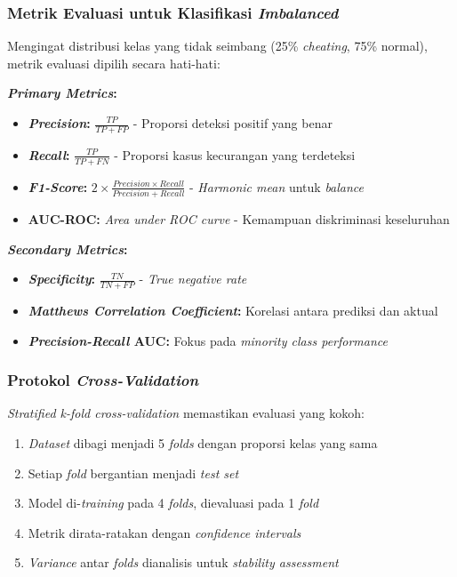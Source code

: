 \subsubsection{Metrik Evaluasi untuk Klasifikasi \textit{Imbalanced}}
\label{sec:metrikEvaluasi}

Mengingat distribusi kelas yang tidak seimbang (25\% \textit{cheating}, 75\% normal), metrik evaluasi dipilih secara hati-hati:

\textbf{\textit{Primary Metrics}:}
\begin{itemize}
    \item \textbf{\textit{Precision}:} $\frac{TP}{TP + FP}$ - Proporsi deteksi positif yang benar
    \item \textbf{\textit{Recall}:} $\frac{TP}{TP + FN}$ - Proporsi kasus kecurangan yang terdeteksi
    \item \textbf{\textit{F1-Score}:} $2 \times \frac{Precision \times Recall}{Precision + Recall}$ - \textit{Harmonic mean} untuk \textit{balance}
    \item \textbf{AUC-ROC:} \textit{Area under ROC curve} - Kemampuan diskriminasi keseluruhan
\end{itemize}

\textbf{\textit{Secondary Metrics}:}
\begin{itemize}
    \item \textbf{\textit{Specificity}:} $\frac{TN}{TN + FP}$ - \textit{True negative rate}
    \item \textbf{\textit{Matthews Correlation Coefficient}:} Korelasi antara prediksi dan aktual
    \item \textbf{\textit{Precision-Recall} AUC:} Fokus pada \textit{minority class performance}
\end{itemize}

\subsubsection{Protokol \textit{Cross-Validation}}
\label{sec:protokolCV}

\textit{Stratified k-fold cross-validation} memastikan evaluasi yang kokoh:

\begin{enumerate}
    \item \textit{Dataset} dibagi menjadi 5 \textit{folds} dengan proporsi kelas yang sama
    \item Setiap \textit{fold} bergantian menjadi \textit{test set}
    \item Model di-\textit{training} pada 4 \textit{folds}, dievaluasi pada 1 \textit{fold}
    \item Metrik dirata-ratakan dengan \textit{confidence intervals}
    \item \textit{Variance} antar \textit{folds} dianalisis untuk \textit{stability assessment}
\end{enumerate}

